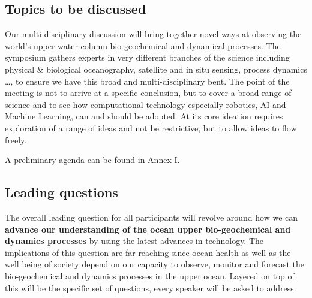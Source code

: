 \subsection{Topics to be discussed}

Our multi-disciplinary discussion will bring together novel ways at
observing the world’s upper water-column bio-geochemical and dynamical
processes. The symposium gathers experts in very different branches of
the science including physical \& biological oceanography, satellite
and in situ sensing, process dynamics \ldots, to ensure we have this
broad and multi-disciplinary bent. The point of the meeting is not to
arrive at a specific conclusion, but to cover a broad range of science
and to see how computational technology especially robotics, AI and
Machine Learning, can and should be adopted. At its core ideation
requires exploration of a range of ideas and not be restrictive, but
to allow ideas to flow freely. 

A preliminary agenda can be found in Annex I.

\subsection{Leading questions}

The overall leading question for all participants will revolve around
how we can \textbf{advance our understanding of the ocean upper
  bio-geochemical and dynamics processes} by using the latest advances
in technology. The implications of this question are far-reaching since
ocean health as well as the well being of society depend on our capacity
to observe, monitor and forecast the bio-geochemical and dynamics
processes in the upper ocean. Layered on top of this will be the
specific set of questions, every speaker will be asked to address:

